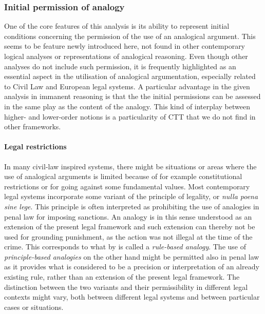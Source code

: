 			\subsubsection{Initial permission of analogy}
			
				One of the core features of this analysis is its ability to represent initial conditions concerning the permission of the use of an analogical argument. This seems to be feature newly introduced here, not found in other contemporary logical analyses or representations of analogical reasoning. Even though other analyses do not include such permission, it is frequently highlighted as an essential aspect in the utilisation of analogical argumentation, especially related to Civil Law and European legal systems. A particular advantage in the given analysis in immanent reasoning is that the the initial permissions can be assessed in the same play as the content of the analogy. This kind of interplay between higher- and lower-order notions is a particularity of CTT that we do not find in other frameworks. 
				
				\paragraph{Legal restrictions}
				
				In many civil-law inspired systems, there might be situations or areas where the use of analogical arguments is limited because of for example constitutional restrictions or for going against some fundamental values. Most contemporary legal systems incorporate some variant of the principle of legality, or \textit{nulla poena sine lege}. This principle is often interpreted as prohibiting the use of analogies in penal law for imposing sanctions. An analogy is in this sense understood as an extension of the present legal framework and such extension can thereby not be used for grounding punishment, as the action was not illegal at the time of the crime. This corresponds to what by \textcite{Langenbucher2017} is called a \textit{rule-based analogy}. The use of \textit{principle-based analogies} on the other hand might be permitted also in penal law as it provides what is considered to be a precision or interpretation of an already existing rule, rather than an extension of the present legal framework. The distinction between the two variants and their permissibility in different legal contexts might vary, both between different legal systems and between particular cases or situations. 
				

